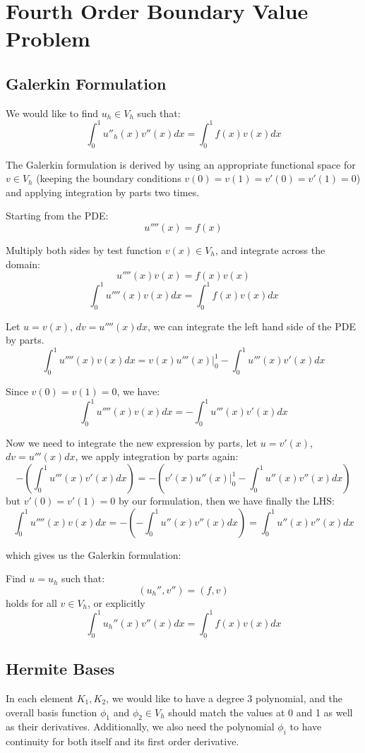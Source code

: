 \documentclass[12pt]{article} %
\begin{document}
\section{Fourth Order Boundary Value Problem}
\subsection{Galerkin Formulation}
We would like to find $u_h\in V_h$ such that:
$$
	\int_{0}^{1}u''_h(x)v''(x)dx = \int_0^{1}f(x)v(x) dx
$$

The Galerkin formulation is derived by using an appropriate functional space for $v\in V_h$ (keeping the boundary conditions $v(0)=v(1)=v'(0) = v'(1) = 0$) and applying integration by parts two times.

Starting from the PDE:
$$
	u''''(x) = f(x)
$$ 

Multiply both sides by test function $v(x) \in V_h$, and integrate across the domain:
$$
	u''''(x) v(x) = f(x)v(x)
$$
$$
	\int_{0}^{1} u''''(x) v(x)dx
	=
	\int_{0}^{1}f(x)v(x)dx
$$

Let $u = v(x)$, $dv = u''''(x)dx$, we can integrate the left hand side of the PDE by parts.
$$
	\int_{0}^{1} u''''(x) v(x)dx = v(x)u'''(x)\biggr\rvert_{0}^{1} - \int_0^1 u'''(x)v'(x)dx
$$

Since $v(0) = v(1) = 0$, we have:
$$
	\int_{0}^{1} u''''(x) v(x)dx
	=
	-\int_0^1 u'''(x)v'(x)dx
$$

Now we need to integrate the new expression by parts, let $u = v'(x)$, $dv = u'''(x)dx$, we apply integration by parts again:
$$
	-(\int_0^1 u'''(x)v'(x)dx)
=
-(v'(x)u''(x)\biggr\rvert_{0}^1 - \int_0^1 u''(x)v''(x)dx)
$$ but $v'(0)=v'(1) = 0$ by our formulation, then we have finally the LHS:
$$
	\int_{0}^{1} u''''(x) v(x)dx = - (-\int_0^1 u''(x)v''(x)dx) = \int_0^1 u''(x)v''(x)dx
$$

which gives us the Galerkin formulation:

Find $u = u_h$ such that:
$$
	(u_h'',v'') = (f,v)
$$ holds for all $v\in V_h$, or explicitly
$$
	\int_0^1 u_h''(x)v''(x)dx
	=
	\int_0^1 f(x)v(x)dx
$$

\subsection{Hermite Bases}
In each element $K_1, K_2$, we would like to have a degree 3 polynomial, and the overall basis function $\phi_1$ and $\phi_2\in V_h$ should match the values at 0 and 1 as well as their derivatives. Additionally, we also need the polynomial $\phi_i$ to have continuity for both itself and its first order derivative. 
\end{document}
